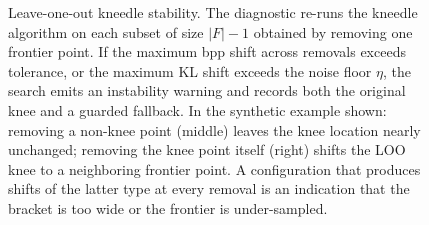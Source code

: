 \begin{figure}[t]
\caption{Leave-one-out kneedle stability. The diagnostic re-runs the
kneedle algorithm on each subset of size $|F|-1$ obtained by removing one
frontier point. If the maximum bpp shift across removals exceeds tolerance,
or the maximum KL shift exceeds the noise floor $\eta$, the search emits
an instability warning and records both the original knee and a guarded
fallback. In the synthetic example shown: removing a non-knee point
(middle) leaves the knee location nearly unchanged; removing the knee point
itself (right) shifts the LOO knee to a neighboring frontier point. A
configuration that produces shifts of the latter type at every removal is
an indication that the bracket is too wide or the frontier is
under-sampled.}
\label{fig:loo_stability}
\end{figure}
